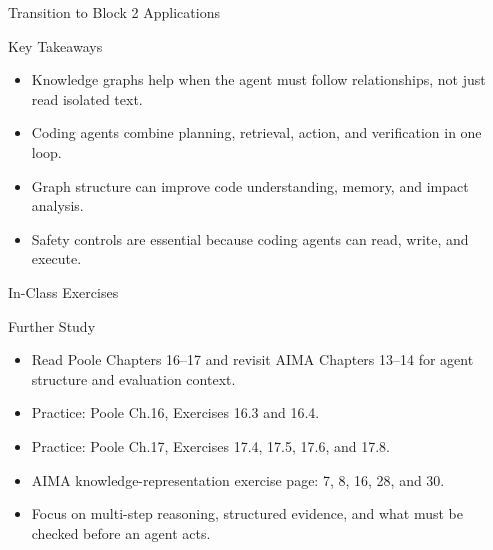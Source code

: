 \documentclass[aspectratio=169]{beamer}
\newcommand{\defaultdeckrefs}{AIMA4e Ch.10 pp.314--343; Poole3e Ch.16--17 pp.701--766; platform docs listed at end}
\newcommand{\currentsliderefs}{\defaultdeckrefs}
\newcommand{\setslideref}[1]{\gdef\currentsliderefs{#1}}
\begin{document}
\setslideref{AIMA4e Ch.13 pp.459--507; AIMA4e Ch.14 pp.509--540; Poole3e Ch.9--10 pp.381--454}
\begin{frame}{Transition to Block 2 Applications}
\begin{center}
\end{center}
\end{frame}

\begin{frame}{Key Takeaways}
\begin{itemize}
  \item Knowledge graphs help when the agent must follow relationships, not just read isolated text.
  \item Coding agents combine planning, retrieval, action, and verification in one loop.
  \item Graph structure can improve code understanding, memory, and impact analysis.
  \item Safety controls are essential because coding agents can read, write, and execute.
\end{itemize}
\end{frame}

\setslideref{AIMA4e Ch.10 pp.314--343; Poole3e Ch.16--17 pp.701--766; exercise prompt on slide}
\begin{frame}{In-Class Exercises}
\end{frame}

\begin{frame}{Further Study}
\begin{itemize}
  \item Read Poole Chapters 16--17 and revisit AIMA Chapters 13--14 for agent structure and evaluation context.
  \item Practice: Poole Ch.16, Exercises 16.3 and 16.4.
  \item Practice: Poole Ch.17, Exercises 17.4, 17.5, 17.6, and 17.8.
  \item AIMA knowledge-representation exercise page: 7, 8, 16, 28, and 30.
  \item Focus on multi-step reasoning, structured evidence, and what must be checked before an agent acts.
\end{itemize}
\end{frame}
\end{document}
